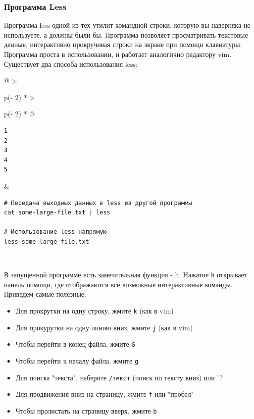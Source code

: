 \documentclass{article}
\begin{document}
\hypertarget{Less}{%
\subsubsection{\texorpdfstring{\protect\hyperlink{Less}{}Программа
Less}{Программа Less}}\label{Less}}

Программа less одной из тех утилит командной строки, которую вы
наверняка не используете, а должны были бы. Программа позволяет
просматривать текстовые денные, интерактивно прокручивая строки на
экране при помощи клавиатуры. Программа проста в использовании, и
работает аналогично редактору vim. Существует два способа использования
less:

\begin{longtable}[]{@{}
  >{\raggedright\arraybackslash}p{(\columnwidth - 2\tabcolsep) * }
  >{\raggedright\arraybackslash}p{(\columnwidth - 2\tabcolsep) * }@{}}
\toprule
\endhead
\begin{minipage}[t]{\linewidth}\raggedright
\begin{verbatim}
1
2
3
4
5
\end{verbatim}
\end{minipage} & \begin{minipage}[t]{\linewidth}\raggedright
\begin{verbatim}
# Передача выходных данных в less из другой программы
cat some-large-file.txt | less

# Использование less напрямую
less some-large-file.txt
\end{verbatim}
\end{minipage} \\ \addlinespace
\bottomrule
\end{longtable}

В запущенной программе есть замечательная функция - h. Нажатие
\texttt{h} открывает панель помощи, где отображаются все возможные
интерактивные команды. Приведем самые полезные.

\begin{itemize}
\tightlist
\item
  Для прокрутки на одну строку, жмите \texttt{k} (как в vim)
\item
  Для прокурутки на одну линию вниз, жмите \texttt{j} (как в vim)
\item
  Чтобы перейти в конец файла, жмите \texttt{G}
\item
  Чтобы перейти к началу файла, жмите \texttt{g}
\item
  Для поиска "текста", наберите \texttt{/текст} (поиск по тексту вниз)
  или '?
\item
  Для продвижения вниз на страницу, жмите \texttt{f} или "пробел"
\item
  Чтобы пролистать на страницу вверх, жмите \texttt{b}
\end{itemize}
\end{document}
